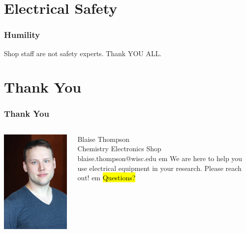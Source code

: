 \documentclass{presentation}
\begin{document}
\section{Electrical Safety}

\begin{frame}\frametitle{Humility}
  Shop staff are not safety experts.
  \vfill
  Thank YOU ALL.
\end{frame}

\section{Thank You}

\begin{frame}\frametitle{Thank You}
  \begin{columns}
    \begin{column}{0.33\textwidth}
      \includegraphics[width=\textwidth]{"./Thompson_Blaise_LowRes.jpg"}
    \end{column}
    \begin{column}{0.67\textwidth}
      Blaise Thompson \\
      Chemistry Electronics Shop \\
      blaise.thompson@wisc.edu
       em
      We are here to help you use electrical equipment in your research.
      Please reach out!
       em
      \hl{Questions?}
    \end{column}
  \end{columns}
\end{frame}
\end{document}
